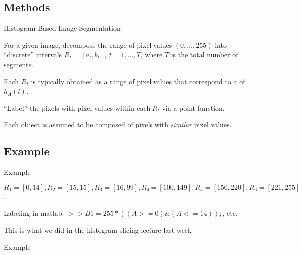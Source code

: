 \subsection{Methods}
%
%
\begin{slide}{Histogram Based Image Segmentation}
\begin{titlelist}{}{}

\item<2-> For a given image, decompose the range of pixel values $(0,\ldots, 255)$ into
``discrete'' intervals $R_t=[a_t,b_t],\ t=1,\ldots,T$, where $T$ is the total
number of segments. 

\item<3-> 
Each $R_t$ is typically obtained as a range of pixel
values that correspond to a  of $h_A(l)$.

\item<4-> 
``Label'' the pixels with pixel values within each $R_t$
via a point function. 

\item<5-> 
 Each object is assumed
to be composed of pixels with {\em similar} pixel values.

\end{titlelist}
\end{slide}


\subsection{Example}
%
%
\begin{slide}{Example}
\vspace{-6ex}
\vspace{-6ex}
\begin{titlelist}{}{}
\small
\item<2-> 
$R_1=[0,14],R_2=[15, 15],R_3=[16, 99],
R_4=[100,149],R_5=[150,220],R_6=[221,255]$.

\item<3-> 
Labeling in matlab: $>> B1=255*((A>=0)\&(A<=14));$, etc.

\item<4-> 
This is what we did in the histogram slicing lecture last week

\end{titlelist}
\end{slide}


%
%
\begin{slide}{Example}
\vspace{-3ex}
\end{slide}

